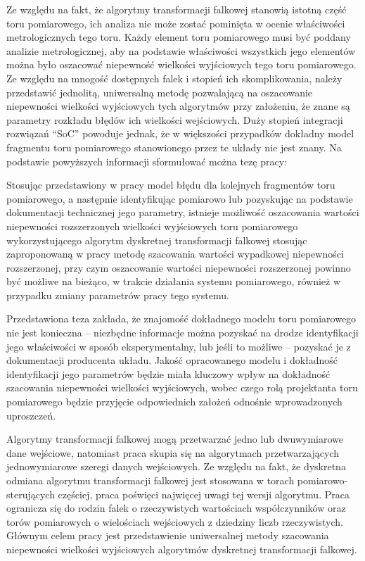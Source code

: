 Ze względu na fakt, że algorytmy transformacji falkowej stanowią istotną część toru pomiarowego, ich analiza nie może zostać pominięta w ocenie właściwości metrologicznych tego toru. Każdy element toru pomiarowego musi być poddany analizie metrologicznej, aby na podstawie właściwości wszystkich jego elementów można było oszacować niepewność wielkości wyjściowych tego toru pomiarowego. Ze względu na mnogość dostępnych falek i stopień ich skomplikowania, należy przedstawić jednolitą, uniwersalną metodę pozwalającą na oszacowanie niepewności wielkości wyjściowych tych algorytmów przy założeniu, że znane są parametry rozkładu błędów ich wielkości wejściowych. Duży stopień integracji rozwiązań \enquote{SoC} powoduje jednak, że w większości przypadków dokładny model fragmentu toru pomiarowego stanowionego przez te układy nie jest znany. Na podstawie powyższych informacji sformułować można tezę pracy:

\begin{quoting}[font = bfseries]
Stosując przedstawiony w pracy model błędu dla kolejnych fragmentów toru pomiarowego, a następnie identyfikując pomiarowo lub pozyskując na podstawie dokumentacji technicznej jego parametry, istnieje możliwość oszacowania wartości niepewności rozszerzonych wielkości wyjściowych toru pomiarowego wykorzystującego algorytm dyskretnej transformacji falkowej stosując zaproponowaną w pracy metodę szacowania wartości wypadkowej niepewności rozszerzonej, przy czym oszacowanie wartości niepewności rozszerzonej powinno być możliwe na bieżąco, w trakcie działania systemu pomiarowego, również w przypadku zmiany parametrów pracy tego systemu.
\end{quoting}

Przedstawiona teza zakłada, że znajomość dokładnego modelu toru pomiarowego nie jest konieczna -- niezbędne informacje można pozyskać na drodze identyfikacji jego właściwości w sposób eksperymentalny, lub jeśli to możliwe -- pozyskać je z dokumentacji producenta układu. Jakość opracowanego modelu i dokładność identyfikacji jego parametrów będzie miała kluczowy wpływ na dokładność szacowania niepewności wielkości wyjściowych, wobec czego rolą projektanta toru pomiarowego będzie przyjęcie odpowiednich założeń odnośnie wprowadzonych uproszczeń.

Algorytmy transformacji falkowej mogą przetwarzać jedno lub dwuwymiarowe dane wejściowe, natomiast praca skupia się na algorytmach przetwarzających jednowymiarowe szeregi danych wejściowych. Ze względu na fakt, że dyskretna odmiana algorytmu transformacji falkowej jest stosowana w torach pomiarowo-sterujących częściej, praca poświęci najwięcej uwagi tej wersji algorytmu. Praca ogranicza się do rodzin falek o rzeczywistych wartościach współczynników oraz torów pomiarowych o wielościach wejściowych z dziedziny liczb rzeczywistych. Głównym celem pracy jest przedstawienie uniwersalnej metody szacowania niepewności wielkości wyjściowych algorytmów dyskretnej transformacji falkowej.

